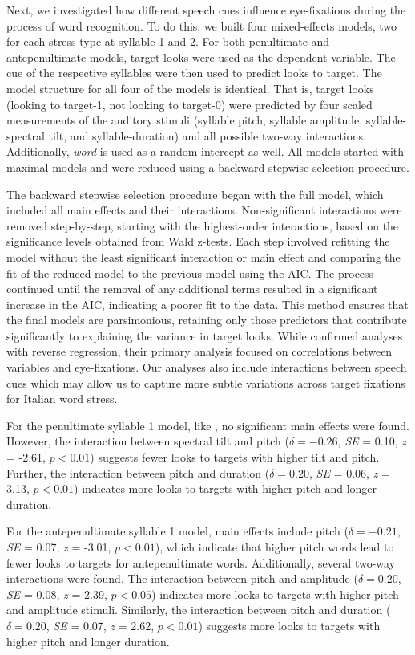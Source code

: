 Next, we investigated how different speech cues influence eye-fixations during the process of word recognition. To do this, we built four mixed-effects models, two for each stress type at syllable 1 and 2. For both penultimate and antepenultimate models, target looks were used as the dependent variable. The cue of the respective syllables were then used to predict looks to target. The model structure for all four of the models is identical. That is, target looks (looking to target-1, not looking to target-0) were predicted by four scaled measurements of the auditory stimuli (syllable pitch, syllable amplitude, syllable-spectral tilt, and syllable-duration) and all possible two-way interactions. Additionally, \textit{word} is used as a random intercept as well. All models started with maximal models and were reduced using a backward stepwise selection procedure. 

The backward stepwise selection procedure began with the full model, which included all main effects and their interactions. Non-significant interactions were removed step-by-step, starting with the highest-order interactions, based on the significance levels obtained from Wald z-tests. Each step involved refitting the model without the least significant interaction or main effect and comparing the fit of the reduced model to the previous model using the AIC. The process continued until the removal of any additional terms resulted in a significant increase in the AIC, indicating a poorer fit to the data. This method ensures that the final models are parsimonious, retaining only those predictors that contribute significantly to explaining the variance in target looks. While \cite{Sulpizio_McQueen_2012} confirmed analyses with reverse regression, their primary analysis focused on correlations between variables and eye-fixations. Our analyses also include interactions between speech cues which may allow us to capture more subtle variations across target fixations for Italian word stress.

For the penultimate syllable 1 model, like \cite{Sulpizio_McQueen_2012}, no significant main effects were found. However, the interaction between spectral tilt and pitch ($\delta = -0.26$, \textit{SE} = 0.10, \textit{z} = -2.61, $p < 0.01$) suggests fewer looks to targets with higher tilt and pitch. Further, the interaction between pitch and duration ($\delta = 0.20$, \textit{SE} = 0.06, \textit{z} = 3.13, $p < 0.01$) indicates more looks to targets with higher pitch and longer duration.

For the antepenultimate syllable 1 model, main effects include pitch ($\delta = -0.21$, \textit{SE} = 0.07, \textit{z} = -3.01, $p < 0.01$), which indicate that higher pitch words lead to fewer looks to targets for antepenultimate words. Additionally, several two-way interactions were found. The interaction between pitch and amplitude ($\delta = 0.20$, \textit{SE} = 0.08, \textit{z} = 2.39, $p < 0.05$) indicates more looks to targets with higher pitch and amplitude stimuli. Similarly, the interaction between pitch and duration ($\delta = 0.20$, \textit{SE} = 0.07, \textit{z} = 2.62, $p < 0.01$) suggests more looks to targets with higher pitch and longer duration. 

